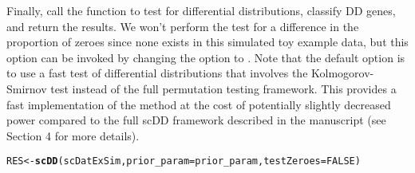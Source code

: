 \documentclass{article}\usepackage[]{graphicx}\usepackage[]{color}
\makeatletter
\newcommand{\hlnum}[1]{\textcolor[rgb]{0.686,0.059,0.569}{#1}}%
\newcommand{\hlstd}[1]{\textcolor[rgb]{0.345,0.345,0.345}{#1}}%
\newcommand{\hlkwb}[1]{\textcolor[rgb]{0.69,0.353,0.396}{#1}}%
\newcommand{\hlkwc}[1]{\textcolor[rgb]{0.333,0.667,0.333}{#1}}%
\newcommand{\hlkwd}[1]{\textcolor[rgb]{0.737,0.353,0.396}{\textbf{#1}}}%
\newenvironment{kframe}{%
 \def\at@end@of@kframe{}%
 \ifinner\ifhmode%
  \def\at@end@of@kframe{\end{minipage}}%
  \begin{minipage}{\columnwidth}%
 \fi\fi%
 \def\FrameCommand##1{\hskip\@totalleftmargin \hskip-\fboxsep
 \colorbox{shadecolor}{##1}\hskip-\fboxsep
     \hskip-\linewidth \hskip-\@totalleftmargin \hskip\columnwidth}%
 \MakeFramed {\advance\hsize-\width
   \@totalleftmargin\z@ \linewidth\hsize
   \@setminipage}}%
 {\par\unskip\endMakeFramed%
 \at@end@of@kframe}
\newenvironment{knitrout}{}{} %
\makeatother
\begin{document}
Finally, call the  function to test for differential distributions, classify DD genes, and return the results.  We won't perform the test for a difference in the proportion of zeroes since none exists in this simulated toy example data, but this option can be invoked by changing the  option to .  Note that the default option is to use a fast test of differential distributions that involves the Kolmogorov-Smirnov test instead of the full permutation testing framework.  This provides a fast implementation of the method at the cost of potentially slightly decreased power compared to the full scDD framework described in the manuscript (see Section 4 for more details).

\begin{knitrout}
\color{fgcolor}\begin{kframe}
\begin{alltt}
\hlstd{RES} \hlkwb{<-} \hlkwd{scDD}\hlstd{(scDatExSim,} \hlkwc{prior_param}\hlstd{=prior_param,} \hlkwc{testZeroes}\hlstd{=}\hlnum{FALSE}\hlstd{)}
\end{alltt}


{\ttfamily\noindent\itshape\color{messagecolor}{\#\# Clustering observed expression data for each gene}}

{\ttfamily\noindent\itshape\color{messagecolor}{\#\# Setting up parallel back-end using 4 cores}}

{\ttfamily\noindent\itshape\color{messagecolor}{\#\# Notice! Number of permutations is set to zero; using Kolmogorov-Smirnov to test for differences in distributions instead of the Bayes Factor permutation test}}

{\ttfamily\noindent\itshape\color{messagecolor}{\#\# Classifying significant genes into patterns}}\end{kframe}
\end{knitrout}
\end{document}
